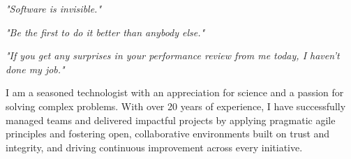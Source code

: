 \documentclass[10pt,a4paper,final]{columncv}
\begin{document}
\begin{cvenv}
\end{cvenv}

\vfill

\begin{center}
  {\textit{\color{subheading}"Software is invisible."}}
\end{center}
\begin{center}
  {\textit{\color{subheading}"Be the first to do it better than anybody else."}}
\end{center}
\begin{center}
  {\textit{\color{subheading}"If you get any surprises in your performance review from me today, I haven't done my job."}}
\end{center}

\pagebreak



I am a seasoned technologist with an appreciation for science and a passion for
solving complex problems. With over 20 years of experience, I have successfully managed
teams and delivered impactful projects by applying pragmatic agile principles and
fostering open, collaborative environments built on trust and integrity, and driving
continuous improvement across every initiative.
\end{document}
